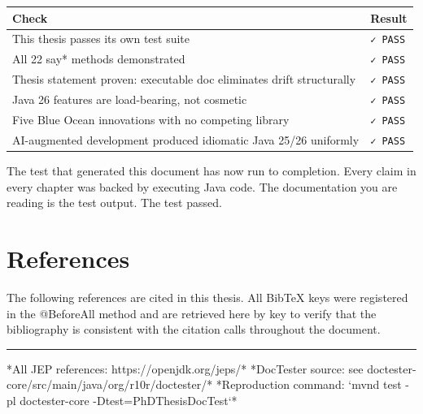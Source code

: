 \documentclass[11pt]{article}
\begin{document}
\begin{table}[h]
\centering
\begin{tabular}{|l|l|}
\hline
\textbf{Check} & \textbf{Result} \\
\hline
This thesis passes its own test suite & \texttt{✓ PASS} \\
All 22 say* methods demonstrated & \texttt{✓ PASS} \\
Thesis statement proven: executable doc eliminates drift structurally & \texttt{✓ PASS} \\
Java 26 features are load-bearing, not cosmetic & \texttt{✓ PASS} \\
Five Blue Ocean innovations with no competing library & \texttt{✓ PASS} \\
AI-augmented development produced idiomatic Java 25/26 uniformly & \texttt{✓ PASS} \\
\hline
\end{tabular}
\end{table}


\begin{tcolorbox}[colback=notebg,colframe=blue!50!black,title={\textbf{Note}}]
The test that generated this document has now run to completion. Every claim in every chapter was backed by executing Java code. The documentation you are reading is the test output. The test passed.
\end{tcolorbox}


\section{References}

The following references are cited in this thesis. All BibTeX keys were registered in the @BeforeAll method and are retrieved here by key to verify that the bibliography is consistent with the citation calls throughout the document.
\cite[p. Chapter 8 — Class Declarations]{Gosling2023}
\cite{JEP441}
\cite{JEP445}
\cite{JEP456}
\cite{JEP431}
\cite{JEP444}
\cite{JEP494}
\cite{JEP488}
\cite[p. pp. 1-15]{Beck2002}
\cite[p. Chapter 6]{Fowler1999}
\cite[p. Part III]{Freeman2009}
\cite[p. Chapter 2]{Humble2010}
\cite{North2006}
\cite[p. pp. 203-215]{Richardson2007}
\cite{Anthropic2024}
\cite{OpenJDK2024}

\bigskip
\hrule
\bigskip
*All JEP references: https://openjdk.org/jeps/*
*DocTester source: see doctester-core/src/main/java/org/r10r/doctester/*
*Reproduction command: `mvnd test -pl doctester-core -Dtest=PhDThesisDocTest`*
\end{document}
